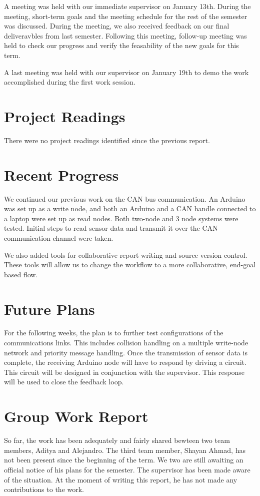 \documentclass[12pt]{article}
\begin{document}
A meeting was held with our immediate supervisor on January 13th. During the
meeting, short-term goals and the meeting schedule for the rest of the semester
was discussed. During the meeting, we also received feedback on our final 
deliveravbles from last semester. Following this meeting, follow-up meeting was
held to check our progress and verify the feasability of the new goals for 
this term.\newline

A last meeting was held with our supervisor on January 19th to demo the work
accomplished during the first work session. 

\section*{Project Readings}
There were no project readings identified since the previous report.

\section*{Recent Progress}
We continued our previous work on the CAN bus communication. An Arduino was set
up as a write node, and both an Arduino and a CAN handle connected to a laptop 
were set up as read nodes. Both two-node and 3 node systems were tested. 
Initial steps to read sensor data and transmit it over the CAN communication
channel were taken.\newline

We also added tools for collaborative report writing and source version control.
These tools will allow us to change the workflow to a more collaborative, 
end-goal based flow.

\section*{Future Plans}
For the following weeks, the plan is to further test configurations of the
communications links. This includes collision handling on a multiple write-node
network and priority message handling. Once the transmission of sensor data is
complete, the receiving Arduino node will have to respond by driving a circuit.
This circuit will be designed in conjunction with the supervisor. This response
will be used to close the feedback loop.

\section*{Group Work Report}
So far, the work has been adequately and fairly shared bewteen two team members,
Aditya and Alejandro. The third team member, Shayan Ahmad, has not been present
since the beginning of the term. We two are still awaiting an official notice
of his plans for the semester. The supervisor has been made aware of the
situation. At the moment of writing this report, he has not made any
contributions to the work.
\end{document}
